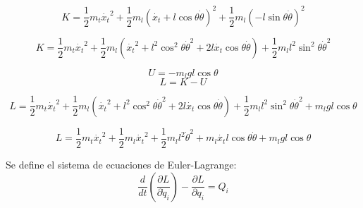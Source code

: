 \documentclass{article}
\begin{document}
            \begin{equation}\label{eq:kinetic3}
                K = \frac{1}{2}m_t\dot{x_t}^2   +\frac{1}{2}m_l(\dot{x_t}+l\cos{\theta}\dot{\theta})^2  +\frac{1}{2}m_l(-l\sin{\theta}\dot{\theta})^2
            \end{equation}

            \begin{equation}\label{eq:kinetic4}
                    K = \frac{1}{2}m_t\dot{x_t}^2 +\frac{1}{2}m_l(\dot{x_t}^2+l^2\cos^2{\theta}\dot{\theta}^2
                    +2l\dot{x_t}\cos{\theta}\dot{\theta})+\frac{1}{2}m_ll^2\sin^2{\theta}\dot{\theta}^2
            \end{equation}

            \begin{equation}\label{eq:potential}
                U = -m_lgl\cos{\theta}
            \end{equation}
            \begin{equation}\label{eq:lagrange}
                L = K - U
            \end{equation}

            \begin{equation}\label{eq:lagrange2}
                    L = \frac{1}{2}m_t\dot{x_t}^2
                    +\frac{1}{2}m_l(\dot{x_t}^2
                +l^2\cos^2{\theta}\dot{\theta}^2
                +2l\dot{x_t}\cos{\theta}\dot{\theta})
                +\frac{1}{2}m_ll^2\sin^2{\theta}\dot{\theta}^2
                +m_lgl\cos{\theta}
            \end{equation}

            \begin{equation}\label{eq:lagrange3}
                L = \frac{1}{2}m_t\dot{x_t}^2+\frac{1}{2}m_l\dot{x_t}^2
                +\frac{1}{2}m_ll^2\dot{\theta}^2
                +m_l\dot{x_t}l\cos{\theta}\dot{\theta}
                +m_lgl\cos{\theta}
            \end{equation}

            Se define el sistema de ecuaciones de Euler-Lagrange:
            \begin{equation}\label{eq:euler1}
                \frac{d}{dt}\left(\frac{\partial L}{\partial \dot{q}_i}\right)-\frac{\partial L}{\partial q_i}=Q_i
            \end{equation}
\end{document}
